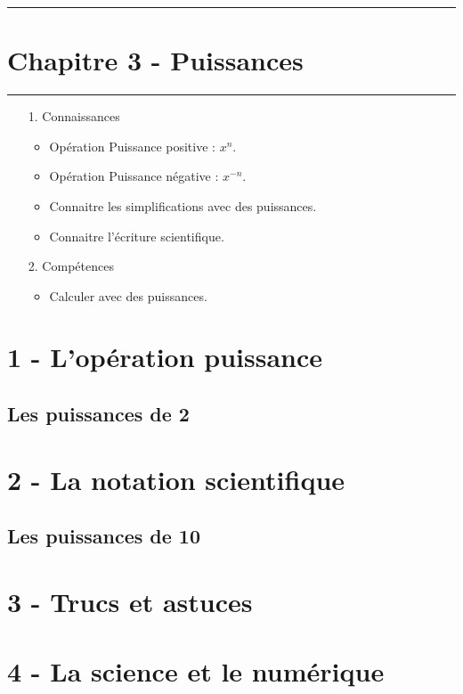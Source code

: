 \documentclass[12pt]{article}
\newcommand{\horrule}[1]{\rule{\linewidth}{#1}} %
\begin{document}

\newtheorem{Definition}{Définition}
\newtheorem{Theorem}{Théorème}
\newtheorem{Proposition}{Propriété}

\renewcommand{\labelitemi}{$\bullet$}
\renewcommand{\labelitemii}{$\circ$}

\setlength{\columnseprule}{1pt}

\horrule{2px}
\section*{Chapitre 3 - Puissances}
\horrule{2px}

\begin{enumerate}
	\item[1.] Connaissances
	      \begin{itemize}
		      \item Opération Puissance positive : $x^n$.
		      \item Opération Puissance négative : $x^{-n}$.
		      \item Connaitre les simplifications avec des puissances.
			  \item Connaitre l'écriture scientifique.
	      \end{itemize}
	\item[2.] Compétences
	      \begin{itemize}
		      \item Calculer avec des puissances.
	      \end{itemize}
\end{enumerate}

\section*{1 - L'opération puissance}

\subsection*{Les puissances de 2}

\section*{2 - La notation scientifique}

\subsection*{Les puissances de 10}

\section*{3 - Trucs et astuces}

\section*{4 - La science et le numérique}
\end{document}

